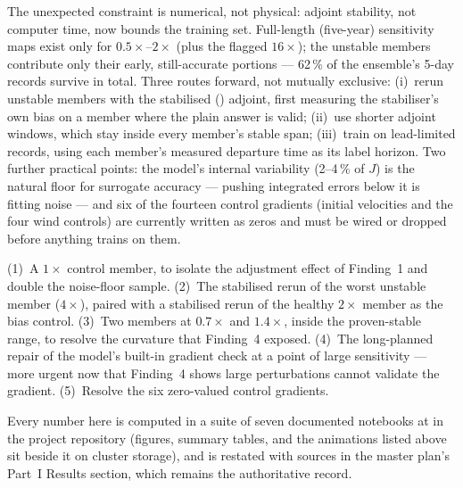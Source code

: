 The unexpected constraint is numerical, not physical: adjoint stability, not
computer time, now bounds the training set. Full-length (five-year)
sensitivity maps exist only for $0.5\times$--$2\times$ (plus the flagged
$16\times$); the unstable members contribute only their early, still-accurate
portions --- 62\,\% of the ensemble's 5-day records survive in total. Three
routes forward, not mutually exclusive: (i)~rerun unstable members with the
stabilised () adjoint, first measuring the stabiliser's
own bias on a member where the plain answer is valid; (ii)~use shorter
adjoint windows, which stay inside every member's stable span;
(iii)~train on lead-limited records, using each member's measured departure
time as its label horizon. Two further practical points: the model's internal
variability (2--4\,\% of $J$) is the natural floor for surrogate accuracy ---
pushing integrated errors below it is fitting noise --- and six of the
fourteen control gradients (initial velocities and the four wind controls)
are currently written as zeros and must be wired or dropped before anything
trains on them.

(1)~A $1\times$ control member, to isolate the adjustment effect of
Finding~1 and double the noise-floor sample. (2)~The stabilised rerun of the
worst unstable member ($4\times$), paired with a stabilised rerun of the
healthy $2\times$ member as the bias control. (3)~Two members at $0.7\times$
and $1.4\times$, inside the proven-stable range, to resolve the curvature
that Finding~4 exposed. (4)~The long-planned repair of the model's built-in
gradient check at a point of large sensitivity --- more urgent now that
Finding~4 shows large perturbations cannot validate the gradient. (5)~Resolve
the six zero-valued control gradients.

Every number here is computed in a suite of seven documented notebooks at
 in the project
repository (figures, summary tables, and the animations listed above sit
beside it on cluster storage), and is restated with sources in the master
plan's Part~I Results section, which remains the authoritative record.
